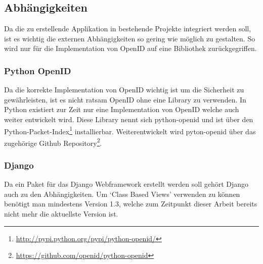\subsection{Abhängigkeiten}
\label{sub:Abhängigkeiten}
Da die zu erstellende Applikation in bestehende Projekte integriert werden soll, ist es wichtig die externen Abhängigkeiten so gering wie möglich zu gestalten. So wird nur für die Implementation von OpenID auf eine Bibliothek zurückgegriffen.

\subsubsection{Python OpenID}
\label{ssub:Python OpenID}
Da die korrekte Implementation von OpenID wichtig ist um die Sicherheit zu gewährleisten, ist es nicht ratsam OpenID ohne eine Library zu verwenden. In Python existiert zur Zeit nur eine Implementation von OpenID welche auch weiter entwickelt wird. Diese Library nennt sich python-openid und ist über den Python-Packet-Index\footnote{\url{http://pypi.python.org/pypi/python-openid/}} installierbar. Weiterentwickelt wird pyton-openid über das zugehörige Github Repository\footnote{\url{https://github.com/openid/python-openid}}.

\subsubsection{Django}
\label{ssub:Django}
Da ein Paket für das Django Webframework erstellt werden soll gehört Django auch zu den Abhängigkeiten. Um `Class Based Views' verwenden zu können benötigt man mindestens Version 1.3, welche zum Zeitpunkt dieser Arbeit bereits nicht mehr die aktuellste Version ist.
